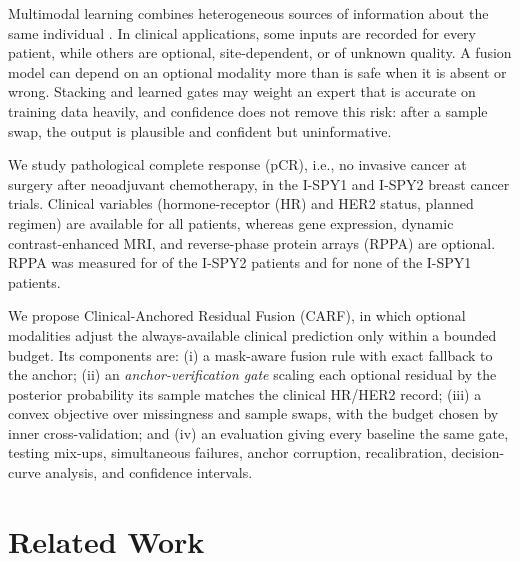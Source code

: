 \documentclass[a4paper,runningheads]{llncs}
\begin{document}
Multimodal learning combines heterogeneous sources of information about the same individual \cite{baltrusaitis2019}. In clinical applications, some inputs are recorded for every patient, while others are optional, site-dependent, or of unknown quality. A fusion model can depend on an optional modality more than is safe when it is absent or wrong. Stacking \cite{wolpert1992} and learned gates may weight an expert that is accurate on training data heavily, and confidence does not remove this risk: after a sample swap, the output is plausible and confident but uninformative.

We study pathological complete response (pCR), i.e., no invasive cancer at surgery after neoadjuvant chemotherapy, in the I-SPY1 \cite{esserman2012} and I-SPY2 \cite{wolf2022ispy} breast cancer trials. Clinical variables (hormone-receptor (HR) and HER2 status, planned regimen) are available for all patients, whereas gene expression, dynamic contrast-enhanced MRI, and reverse-phase protein arrays (RPPA) are optional. RPPA was measured for \NRppa{} of the \NDev{} I-SPY2 patients and for none of the I-SPY1 patients.

We propose Clinical-Anchored Residual Fusion (CARF), in which optional modalities adjust the always-available clinical prediction only within a bounded budget. Its components are: (i) a mask-aware fusion rule with exact fallback to the anchor; (ii) an \emph{anchor-verification gate} scaling each optional residual by the posterior probability its sample matches the clinical HR/HER2 record; (iii) a convex objective over missingness and sample swaps, with the budget chosen by inner cross-validation; and (iv) an evaluation giving every baseline the same gate, testing mix-ups, simultaneous failures, anchor corruption, recalibration, decision-curve analysis, and confidence intervals.
\section{Related Work}
\end{document}
